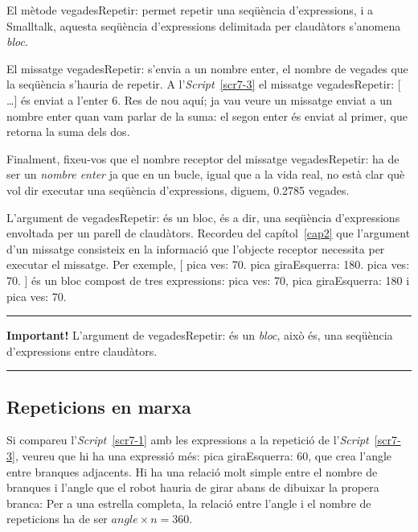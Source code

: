 El mètode \textsf{vegadesRepetir:} permet repetir una seqüència d'expressions, i a Smalltalk, aquesta seqüència d'expressions delimitada per claudàtors s'anomena \emph{bloc}.  

El missatge \textsf{vegadesRepetir:} s'envia a un nombre enter, el nombre de vegades que la seqüència s'hauria de repetir. A l'\emph{Script}~\ref{scr7-3} el missatge \textsf{vegadesRepetir: [ \dots ]} és enviat a l'enter \textsf{6}. Res de nou aquí; ja vau veure un missatge enviat a un nombre enter quan vam parlar de la suma: el segon enter és enviat al primer, que retorna la suma dels dos.

Finalment, fixeu-vos que el nombre receptor del missatge \textsf{vegadesRepetir:} ha de ser un \emph{nombre enter} ja que en un bucle, igual que a la vida real, no està clar què vol dir executar una seqüència d'expressions, diguem, 0.2785 vegades.

L'argument de \textsf{vegadesRepetir:} és un bloc, és a dir, una seqüència d'expressions envoltada per un parell de claudàtors. Recordeu del capítol~\ref{cap2} que l'argument d'un missatge consisteix en la informació que l'objecte receptor necessita per executar el missatge. Per exemple, \textsf{[ pica ves: 70. pica giraEsquerra: 180. pica ves: 70. ]} és un bloc compost de tres expressions: \textsf{pica ves: 70}, \textsf{pica giraEsquerra: 180} i \textsf{pica ves: 70}.  

\noindent
\rule{\textwidth}{2pt}
\noindent
\textbf{Important!} L'argument de \textsf{vegadesRepetir:} és un \emph{bloc}, això és, una seqüència d'expressions entre claudàtors.\\
\noindent
\rule{\textwidth}{2pt}

\subsection{Repeticions en marxa}

Si compareu l'\emph{Script}~\ref{scr7-1} amb les expressions a la repetició de l'\emph{Script}~\ref{scr7-3}, veureu que hi ha una expressió més: \textsf{pica giraEsquerra: 60}, que crea l'angle entre branques adjacents. Hi ha una relació molt simple entre el nombre de branques i l'angle que el robot hauria de girar abans de dibuixar la propera branca: Per a una estrella completa, la relació entre l'angle i el nombre de repeticions ha de ser $angle \times n = 360$.

